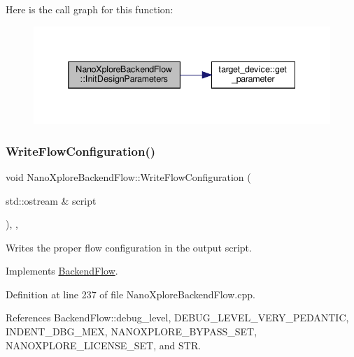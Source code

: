 Here is the call graph for this function\+:
\nopagebreak
\begin{figure}[H]
\begin{center}
\leavevmode
\includegraphics[width=338pt]{d3/d3c/classNanoXploreBackendFlow_a56157c2264c3b823bb2a6cb5d1386d63_cgraph}
\end{center}
\end{figure}
\mbox{\label{classNanoXploreBackendFlow_a90dc6de670aa2eaf5b8dbc9daf7a1ba2}} 
\subsubsection{\texorpdfstring{Write\+Flow\+Configuration()}{WriteFlowConfiguration()}}
{\footnotesize\ttfamily void Nano\+Xplore\+Backend\+Flow\+::\+Write\+Flow\+Configuration (\begin{DoxyParamCaption}\item[{std\+::ostream \&}]{script }\end{DoxyParamCaption})\hspace{0.3cm}{\ttfamily [override]}, {\ttfamily [protected]}, {\ttfamily [virtual]}}



Writes the proper flow configuration in the output script. 



Implements \hyperlink{classBackendFlow_acd93b1846b958eb6b7e10b9894bf5615}{Backend\+Flow}.



Definition at line 237 of file Nano\+Xplore\+Backend\+Flow.\+cpp.



References Backend\+Flow\+::debug\+\_\+level, D\+E\+B\+U\+G\+\_\+\+L\+E\+V\+E\+L\+\_\+\+V\+E\+R\+Y\+\_\+\+P\+E\+D\+A\+N\+T\+IC, I\+N\+D\+E\+N\+T\+\_\+\+D\+B\+G\+\_\+\+M\+EX, N\+A\+N\+O\+X\+P\+L\+O\+R\+E\+\_\+\+B\+Y\+P\+A\+S\+S\+\_\+\+S\+ET, N\+A\+N\+O\+X\+P\+L\+O\+R\+E\+\_\+\+L\+I\+C\+E\+N\+S\+E\+\_\+\+S\+ET, and S\+TR.

